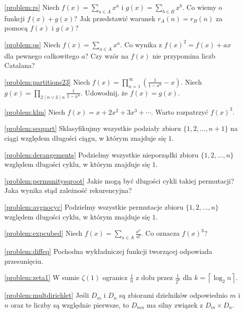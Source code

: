 \documentclass[shortabstract]{imthesis}
\begin{document}
\begin{enumerate}
\item[\ref{problem:rs}] Niech $f(x) = \sum_{a \in A} x^a$ i $g(x) = \sum_{b \in B} x^b$. Co wiemy o funkcji $f(x)+g(x)$? Jak przedstawić warunek $r_A(n) = r_B(n)$ za pomocą $f(x)$ i $g(x)$?

\item[\ref{problem:qs}] Niech $f(x) = \sum_{a \in A} x^a$. Co wynika z $f(x)^2 = f(x)+ax$ dla pewnego całkowitego $a$? Czy wzór na $f(x)$ nie przypomina liczb Catalana?

\item[\ref{problem:partitions23}] Niech $f(x) = \prod_{n=1}^\infty \left(\frac{1}{1-x^n}-x\right)$. Niech $g(x) = \prod_{2\mid n \vee 3\mid n} \frac{1}{1-x^n}$. Udowodnij, że $f(x) = g(x)$.

\item[\ref{problem:klm}] Niech $f(x) = x + 2x^2 + 3x^3 + \cdots$. Warto rozpatrzyć $f(x)^3$.

\item[\ref{problem:seqpart}] Sklasyfikujmy wszystkie podziały zbioru $\{1, 2, \ldots, n+1\}$ na ciągi względem długości ciągu, w którym znajduje się $1$. 

\item[\ref{problem:derangements}] Podzielmy wszystkie nieporządki zbioru $\{1, 2, \ldots, n\}$ względem długości cyklu, w którym znajduje się $1$.

\item[\ref{problem:permunitysqroot}] Jakie mogą być długości cykli takiej permutacji? Jaka wynika stąd zależność rekurencyjna?

\item[\ref{problem:avgnocyc}] Podzielmy wszystkie permutacje zbioru $\{1, 2, \ldots, n\}$ względem długości cyklu, w którym znajduje się $1$.

\item[\ref{problem:expcubed}] Niech $f(x) = \sum_{a \in A} \frac{x^a}{a!}$. Co oznacza $f(x)^3$?

\item[\ref{problem:diffeq}] Pochodna wykładniczej funkcji tworzącej odpowiada przesunięciu.

\item[\ref{problem:zeta1}] W sumie $\zeta(1)$ ogranicz $\frac{1}{n}$ z dołu przez $\frac{1}{2^k}$ dla $k = \left\lceil \log_2 n\right\rceil$.

\item[\ref{problem:multdirichlet}] Jeśli $D_m$ i $D_n$ są zbiorami dzielników odpowiednio $m$ i $n$ oraz te liczby są względnie pierwsze, to $D_{mn}$ ma silny związek z $D_m \times D_n$.


\end{enumerate}
\end{document}
